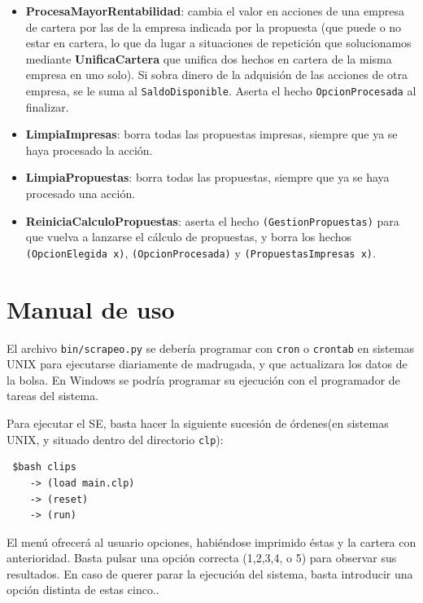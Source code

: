 \documentclass[a4paper,11pt]{article}
\begin{document}
\begin{itemize}
\begin{itemize}
\item \textbf{ProcesaMayorRentabilidad}: cambia el valor en acciones de una empresa de cartera por las de la empresa indicada
por la propuesta (que puede o no estar en cartera, lo que da lugar a situaciones de repetición que solucionamos mediante
\textbf{UnificaCartera} que unifica dos hechos en cartera de la misma empresa en uno solo). Si sobra dinero de la adquisión
de las acciones de otra empresa, se le suma al \texttt{SaldoDisponible}. Aserta el hecho \texttt{OpcionProcesada} 
al finalizar.

\item \textbf{LimpiaImpresas}: borra todas las propuestas impresas, siempre que ya se haya procesado la acción.

\item \textbf{LimpiaPropuestas}: borra todas las propuestas, siempre que ya se haya procesado una acción.

\item \textbf{ReiniciaCalculoPropuestas}: aserta el hecho \texttt{(GestionPropuestas)} para que vuelva a lanzarse el cálculo de
propuestas, y borra los hechos \texttt{(OpcionElegida x)}, \texttt{(OpcionProcesada)} y \texttt{(PropuestasImpresas x)}.

\end{itemize}

\end{itemize}



\section{Manual de uso}

El archivo \texttt{bin/scrapeo.py} se debería programar con \texttt{cron} o \texttt{crontab} en sistemas UNIX
para ejecutarse diariamente de madrugada, y que actualizara los datos de la bolsa. En Windows se podría programar su ejecución 
con el programador de tareas del sistema.

Para ejecutar el SE, basta hacer la siguiente sucesión de órdenes(en sistemas UNIX, y situado dentro del directorio \texttt{clp}):

\begin{verbatim}
 $bash clips
    -> (load main.clp)
    -> (reset)
    -> (run)
\end{verbatim}

El menú ofrecerá al usuario opciones, habiéndose imprimido éstas y la cartera con anterioridad. Basta pulsar una opción correcta
(1,2,3,4, o 5) para observar sus resultados. En caso de querer parar la ejecución del sistema, basta introducir una opción
distinta de estas cinco..
\end{document}
